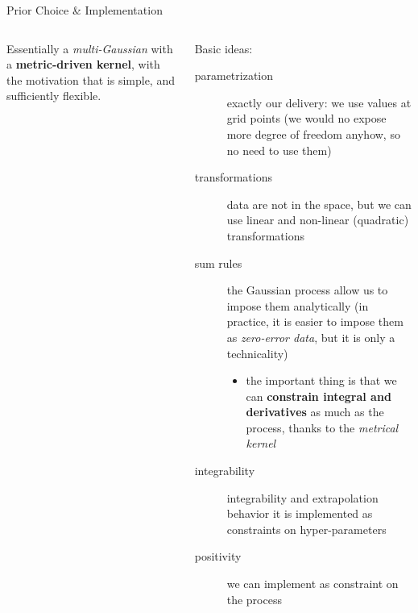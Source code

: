 \documentclass[9pt]{beamer}
\begin{document}
\begin{frame}{Prior Choice \& Implementation}
\begin{columns}
\begin{column}{0.5\textwidth}
            Essentially a \textit{multi-Gaussian} with a \textbf{metric-driven
            kernel}, with the motivation that is simple, and sufficiently
            flexible.
        \end{column}
        \begin{column}{0.5\textwidth}
            Basic ideas:
            \begin{description}
                \item[parametrization] exactly our delivery: we use \pdf values
                    at grid points (we would no expose more degree of freedom
                    anyhow, so no need to use them)
                \item[transformations] data are not in the \pdf space, but we
                    can use linear and non-linear (quadratic) transformations
                \item[sum rules] the Gaussian process allow us to impose them
                    analytically (in practice, it is easier to impose them as
                    \textit{zero-error data}, but it is only a technicality)
                    \begin{itemize}
                        \item the important thing is that we can
                            \textbf{constrain integral and derivatives} as much
                            as the process, thanks to the \textit{metrical
                            kernel}
                    \end{itemize}
                \item[integrability] integrability and extrapolation behavior
                    it is implemented as constraints on hyper-parameters
                \item[positivity] we can implement as constraint on the process
            \end{description}
        \end{column}
    \end{columns}
\end{frame}
\end{document}
